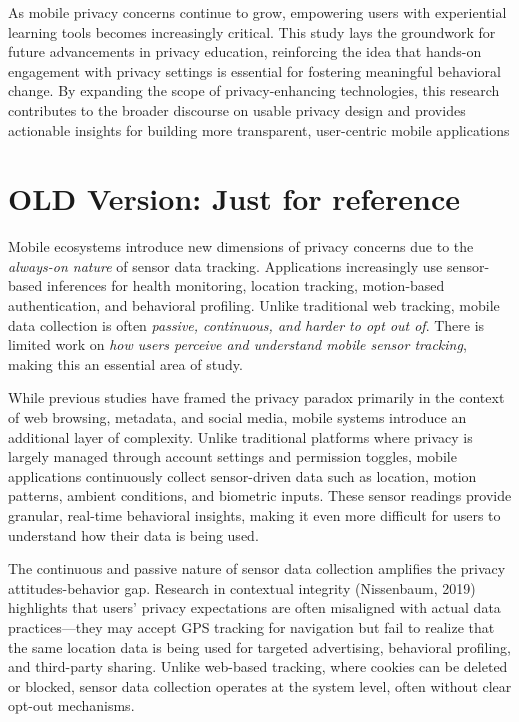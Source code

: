 \documentclass[acmlarge, nonacm]{acmart}
\begin{document}
As mobile privacy concerns continue to grow, empowering users with experiential learning tools becomes increasingly critical. This study lays the groundwork for future advancements in privacy education, reinforcing the idea that hands-on engagement with privacy settings is essential for fostering meaningful behavioral change. By expanding the scope of privacy-enhancing technologies, this research contributes to the broader discourse on usable privacy design and provides actionable insights for building more transparent, user-centric mobile applications


















\section{OLD Version:  Just for reference}

Mobile ecosystems introduce new dimensions of privacy concerns due to the \textit{always-on nature} of sensor data tracking. Applications increasingly use sensor-based inferences for health monitoring, location tracking, motion-based authentication, and behavioral profiling. Unlike traditional web tracking, mobile data collection is often \textit{passive, continuous, and harder to opt out of}. There is limited work on \textit{how users perceive and understand mobile sensor tracking}, making this an essential area of study.

While previous studies have framed the privacy paradox primarily in the context of web browsing, metadata, and social media, mobile systems introduce an additional layer of complexity. Unlike traditional platforms where privacy is largely managed through account settings and permission toggles, mobile applications continuously collect sensor-driven data such as location, motion patterns, ambient conditions, and biometric inputs. These sensor readings provide granular, real-time behavioral insights, making it even more difficult for users to understand how their data is being used.

The continuous and passive nature of sensor data collection amplifies the privacy attitudes-behavior gap. Research in contextual integrity (Nissenbaum, 2019) highlights that users’ privacy expectations are often misaligned with actual data practices—they may accept GPS tracking for navigation but fail to realize that the same location data is being used for targeted advertising, behavioral profiling, and third-party sharing. Unlike web-based tracking, where cookies can be deleted or blocked, sensor data collection operates at the system level, often without clear opt-out mechanisms.
\end{document}
